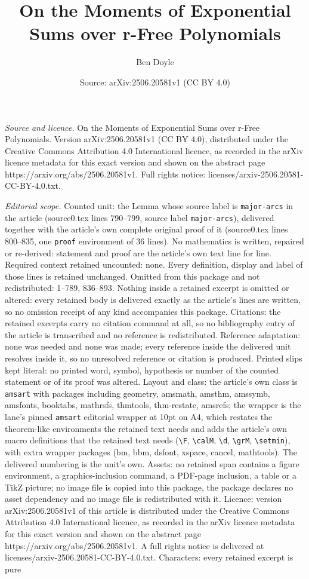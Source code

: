 \documentclass[10pt,a4paper]{amsart}
\title[On the Moments of Exponential Sums over r-Free Polynomials]{On the Moments of Exponential Sums over r-Free Polynomials}
\author{Ben Doyle}
\date{Source: arXiv:2506.20581v1 (CC BY 4.0)}
\begin{document}
\maketitle

\noindent\emph{Source and licence.} On the Moments of Exponential Sums over r-Free Polynomials. Version arXiv:2506.20581v1 (CC BY 4.0), distributed under the Creative Commons Attribution 4.0 International licence, as recorded in the arXiv licence metadata for this exact version and shown on the abstract page https://arxiv.org/abs/2506.20581v1. Full rights notice: licenses/arxiv-2506.20581-CC-BY-4.0.txt.\par\smallskip

\noindent\textit{Editorial scope.} Counted unit: the Lemma whose source label is \texttt{major-arcs} in the article (source0.tex lines 790--799, source label \texttt{major-arcs}), delivered together with the article's own complete original proof of it (source0.tex lines 800--835, one \texttt{proof} environment of 36 lines). No mathematics is written, repaired or re-derived: statement and proof are the article's own text line for line. Required context retained uncounted: none. Every definition, display and label of those lines is retained unchanged. Omitted from this package and not redistributed: 1--789, 836--893. Nothing inside a retained excerpt is omitted or altered: every retained body is delivered exactly as the article's lines are written, so no omission receipt of any kind accompanies this package. Citations: the retained excerpts carry no citation command at all, so no bibliography entry of the article is transcribed and no reference is redistributed. Reference adaptation: none was needed and none was made; every reference inside the delivered unit resolves inside it, so no unresolved reference or citation is produced. Printed slips kept literal: no printed word, symbol, hypothesis or number of the counted statement or of its proof was altered. Layout and class: the article's own class is \texttt{amsart} with packages including geometry, amsmath, amsthm, amssymb, amsfonts, booktabs, mathrsfs, thmtools, thm-restate, amsrefs; the wrapper is the lane's pinned \texttt{amsart} editorial wrapper at 10pt on A4, which restates the theorem-like environments the retained text needs and adds the article's own macro definitions that the retained text needs (\texttt{\textbackslash F}, \texttt{\textbackslash calM}, \texttt{\textbackslash d}, \texttt{\textbackslash grM}, \texttt{\textbackslash setmin}), with extra wrapper packages (bm, bbm, dsfont, xspace, cancel, mathtools). The delivered numbering is the unit's own. Assets: no retained span contains a figure environment, a graphics-inclusion command, a PDF-page inclusion, a table or a TikZ picture; no image file is copied into this package, the package declares no asset dependency and no image file is redistributed with it. Licence: version arXiv:2506.20581v1 of this article is distributed under the Creative Commons Attribution 4.0 International licence, as recorded in the arXiv licence metadata for this exact version and shown on the abstract page https://arxiv.org/abs/2506.20581v1. A full rights notice is delivered at licenses/arxiv-2506.20581-CC-BY-4.0.txt. Characters: every retained excerpt is pure 
\end{document}
